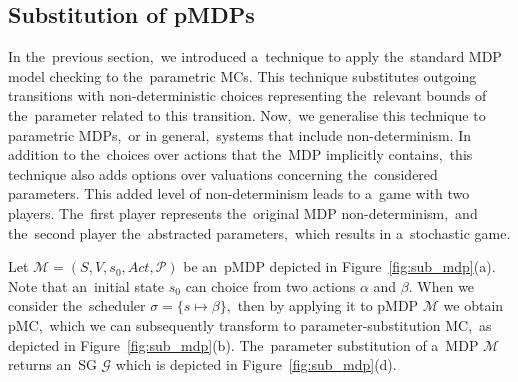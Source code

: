 \subsection{Substitution of pMDPs}
In the~previous section,~we introduced a~technique to apply the~standard MDP model checking to the~parametric MCs. 
This technique substitutes outgoing transitions with non-deterministic choices representing the~relevant bounds of the~parameter related to this transition.
Now,~we generalise this technique to parametric MDPs,~or in general,~systems that include non-determinism.
In addition to the~choices over actions that the~MDP implicitly contains,~this technique also adds options over valuations concerning the~considered parameters.
This added level of non-determinism leads to a~game with two players.
The~first player represents the~original MDP non-determinism,~and the~second player the~abstracted parameters,~which results in a~stochastic game.

\begin{example}
Let $\mathcal{M} = (S, V, s_0, Act, \mathcal{P})$ be an~pMDP depicted in Figure~\ref{fig:sub_mdp}(a).
Note that an~initial state $s_0$ can choice from two actions $\alpha$ and $\beta$.
When we consider the~scheduler $\sigma = \{ s \mapsto \beta \}$,~then by applying it to pMDP $\mathcal{M}$ we obtain pMC,~which we can subsequently transform to parameter-substitution MC,~as depicted in Figure~\ref{fig:sub_mdp}(b).
The~parameter substitution of a~MDP $\mathcal{M}$ returns an~SG $\mathcal{G}$ which is depicted in Figure~\ref{fig:sub_mdp}(d).
\end{example}


